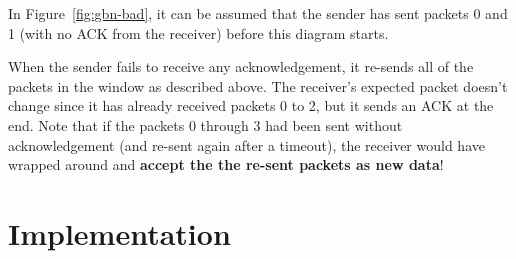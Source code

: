 \documentclass[a4paper]{article}
\numberwithin{figure}{section}
\numberwithin{table}{section}
\begin{document}
\newpage
In Figure~\ref{fig:gbn-bad}, it can be assumed that the sender has sent packets 0 and 1 (with no ACK from the receiver) before this diagram starts.

When the sender fails to receive any acknowledgement, it re-sends all of the packets in the window as described above. The receiver's expected packet doesn't change since it has already received packets 0 to 2, but it sends an ACK at the end. Note that if the packets 0 through 3 had been sent without acknowledgement (and re-sent again after a timeout), the receiver would have wrapped around and \textbf{accept the the re-sent packets as new data}!

\section{Implementation}

\clearpage
{}
{}
\printbibliography
\end{document}

